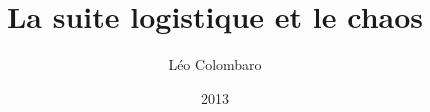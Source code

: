 \documentclass[11pt,a4paper]{report}
\title{La suite logistique et le chaos}
\author{Léo Colombaro}
\date{2013\space\textperiodcentered\space 2014}
\begin{document}


%

\makeglossaries



\end{document}
